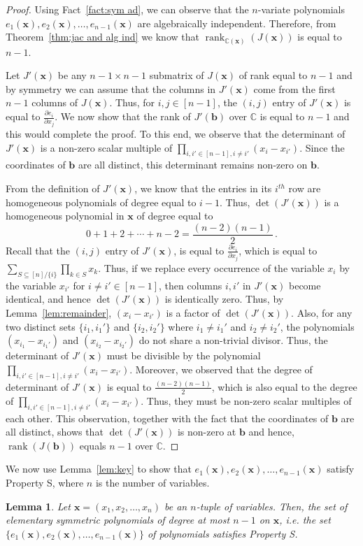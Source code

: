 \documentclass[10pt,a4paper]{article}
\newtheorem{lemma}[theorem]{Lemma}
\theoremstyle{definition}
\newcommand{\F}{\mathbb C}
\newcommand{\vb}{\mathbf b}
\newcommand{\vx}{\mathbf x}
\DeclareMathOperator{\rank}{rank}
\begin{document}
\begin{proof}
Using Fact~\ref{fact:sym ad}, we can observe that  the $n$-variate polynomials $e_1(\vx), e_2(\vx), \ldots, e_{n-1}(\vx)$ are algebraically independent.
Therefore, from Theorem~\ref{thm:jac and alg ind} we know that $\rank_{\F(\vx)}\left(J(\vx) \right)$ is equal to $n-1$. 

Let $J'(\vx)$ be any $n-1 \times n-1$ submatrix of $J(\vx)$ of rank equal to $n-1$ and by symmetry we can assume that the columns in $J'(\vx)$ come from the first $n-1$ columns of $J(\vx)$. Thus, for $i, j \in [n-1]$, the $(i, j)$ entry of $J'(\vx)$ is equal to $\frac{\partial e_i}{\partial x_j}$. We now show that the rank of $J'(\vb)$ over $\F$ is equal to $n-1$ and this would complete the proof. To this end, we observe that the determinant of $J'(\vx)$ is a non-zero scalar multiple of $\prod_{i, i' \in [n-1], i \neq i'}(x_i-x_{i'})$. Since the coordinates of $\vb$ are all distinct, this determinant remains non-zero on $\vb$. 

From the definition of $J'(\vx)$, we know that the entries in its $i^{th}$ row are homogeneous polynomials of degree equal to $i-1$. Thus, $\det(J'(\vx))$ is a homogeneous polynomial in $\vx$ of degree equal to \[
0 + 1 + 2 + \cdots + n-2 = \frac{(n-2)(n-1)}{2} \, . \] Recall that the $(i, j)$ entry of $J'(\vx)$, is equal to $\frac{\partial e_i}{\partial x_j}$, which is equal to $\sum_{S \subseteq [n]/ \{i\}}\prod_{k \in S} x_k$. Thus, if we replace every occurrence of the variable $x_i$ by the variable $x_{i'}$ for $i \neq i' \in [n-1]$, then columns $i, i'$ in $J'(\vx)$ become identical, and hence $\det(J'(\vx))$ is identically zero. Thus, by Lemma~\ref{lem:remainder}, $(x_i-x_{i'})$ is a factor of $\det(J'(\vx))$. Also, for any two distinct sets $\{i_1, i_1'\}$ and $\{i_2, i_2'\}$ where $i_1 \neq i_1'$ and $i_2 \neq i_2'$, the polynomials $(x_{i_1}-x_{i_1'})$ and $(x_{i_2}-x_{i_2'})$ do not share a non-trivial divisor. Thus, the determinant of $J'(\vx)$ must be divisible by the polynomial $\prod_{i, i' \in [n-1], i \neq i'}(x_i-x_{i'})$. Moreover, we observed that the degree of determinant of $J'(\vx)$ is equal to $\frac{(n-2)(n-1)}{2}$, which is also equal to the degree of $\prod_{i, i' \in [n-1], i \neq i'}(x_i-x_{i'})$. Thus, they must be non-zero scalar multiples of each other. This observation, together with the fact that the coordinates of $\vb$ are all distinct, shows that $\det(J'(\vx))$ is non-zero at $\vb$ and hence, $\rank(J(\vb))$ equals $n-1$ over $\F$.
\end{proof}
We now use Lemma~\ref{lem:key} to show that $e_1(\vx), e_2(\vx), \ldots, e_{n-1}(\vx)$ satisfy Property S, where $n$ is the number of variables.
\begin{lemma}\label{lem:esym prop s}
Let $\vx = (x_1, x_2, \ldots, x_n)$ be an $n$-tuple of variables. Then, the set of elementary symmetric polynomials of degree at most $n-1$ on $\vx$, i.e. the set $\{e_1(\vx), e_2(\vx), \ldots, e_{n-1}(\vx)\}$ of polynomials satisfies Property S. 
\end{lemma}
\end{document}

